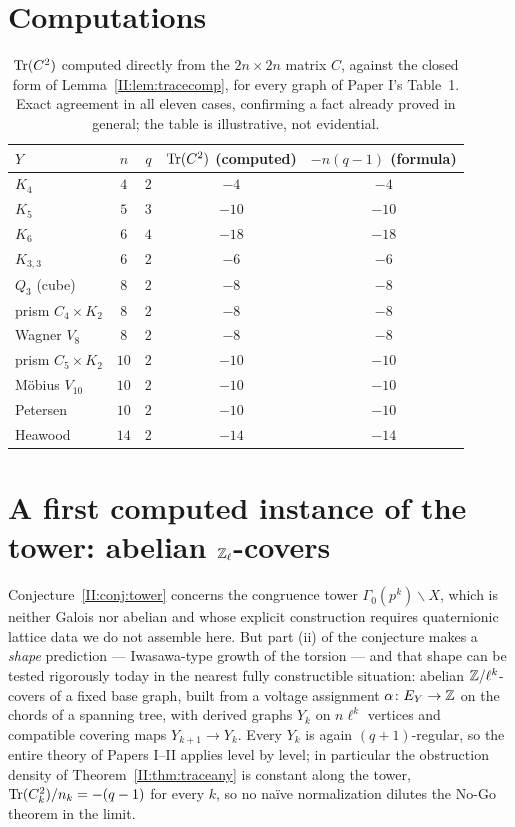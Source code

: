 \section{Computations}\label{II:sec:computations}

\begin{table}[ht]
\centering\small
\renewcommand{\arraystretch}{1.15}
\begin{tabular}{lcccc}
\toprule
$Y$ & $n$ & $q$ & $\operatorname{Tr}(C^2)$ (computed) & $-n(q-1)$ (formula)\\
\midrule
$K_4$              & $4$  & $2$ & $-4$  & $-4$\\
$K_5$              & $5$  & $3$ & $-10$ & $-10$\\
$K_6$              & $6$  & $4$ & $-18$ & $-18$\\
$K_{3,3}$          & $6$  & $2$ & $-6$  & $-6$\\
$Q_3$ (cube)       & $8$  & $2$ & $-8$  & $-8$\\
prism $C_4\times K_2$&$8$ & $2$ & $-8$  & $-8$\\
Wagner $V_8$       & $8$  & $2$ & $-8$  & $-8$\\
prism $C_5\times K_2$&$10$& $2$ & $-10$ & $-10$\\
M\"obius $V_{10}$  & $10$ & $2$ & $-10$ & $-10$\\
Petersen           & $10$ & $2$ & $-10$ & $-10$\\
Heawood            & $14$ & $2$ & $-14$ & $-14$\\
\bottomrule
\end{tabular}
\medskip
\caption{$\operatorname{Tr}(C^2)$ computed directly from the $2n\times2n$ matrix $C$, against the
closed form of Lemma~\ref{II:lem:tracecomp}, for every graph of Paper I's Table~1. Exact
agreement in all eleven cases, confirming a fact already proved in general; the table is
illustrative, not evidential.}
\label{II:tab:trace}
\end{table}

\section{A first computed instance of the tower: abelian
\texorpdfstring{$\mathbb{Z}_\ell$}{Z-l}-covers}\label{II:sec:abtower}

Conjecture~\ref{II:conj:tower} concerns the congruence tower $\Gamma_0(p^k)\backslash X$,
which is neither Galois nor abelian and whose explicit construction requires quaternionic
lattice data we do not assemble here. But part (ii) of the conjecture makes a
\emph{shape} prediction --- Iwasawa-type growth of the torsion --- and that shape can be
tested rigorously today in the nearest fully constructible situation: abelian
$\mathbb{Z}/\ell^k$-covers of a fixed base graph, built from a voltage assignment
$\alpha\colon E_Y\to\mathbb{Z}$ on the chords of a spanning tree, with derived graphs
$Y_k$ on $n\ell^k$ vertices and compatible covering maps $Y_{k+1}\to Y_k$. Every $Y_k$ is
again $(q+1)$-regular, so the entire theory of Papers I--II applies level by level; in
particular the obstruction density of Theorem~\ref{II:thm:traceany} is constant along the
tower, $\operatorname{Tr}(C_k^2)/n_k=-(q-1)$ for every $k$, so no na\"ive normalization dilutes the
No-Go theorem in the limit.

